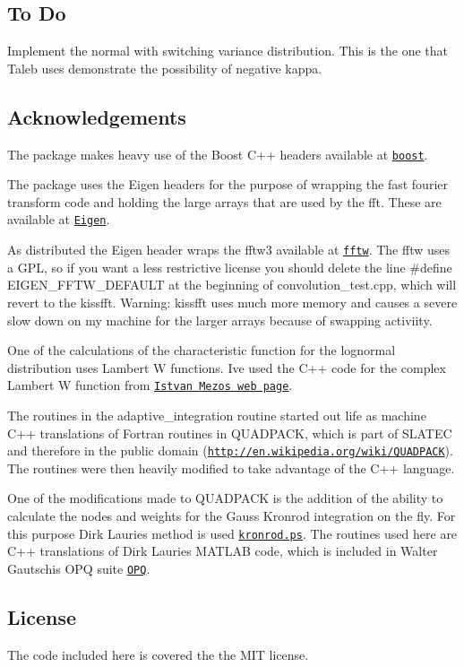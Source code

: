 \subsection*{To Do}


\begin{DoxyItemize}
\item Implement the normal with switching variance distribution. This is the one that Taleb uses demonstrate the possibility of negative kappa.
\end{DoxyItemize}

\subsection*{Acknowledgements}


\begin{DoxyEnumerate}
\item The package makes heavy use of the Boost C++ headers available at \href{http://www.boost.org}{\tt boost}.
\item The package uses the Eigen headers for the purpose of wrapping the fast fourier transform code and holding the large arrays that are used by the fft. These are available at \href{http://www.eigen.tuxfamily.org}{\tt Eigen}.
\item As distributed the Eigen header wraps the fftw3 available at \href{http://fftw.org}{\tt fftw}. The fftw uses a G\+PL, so if you want a less restrictive license you should delete the line \#define E\+I\+G\+E\+N\+\_\+\+F\+F\+T\+W\+\_\+\+D\+E\+F\+A\+U\+LT at the beginning of convolution\+\_\+test.\+cpp, which will revert to the kissfft. Warning\+: kissfft uses much more memory and causes a severe slow down on my machine for the larger arrays because of swapping activiity.
\item One of the calculations of the characteristic function for the lognormal distribution uses Lambert W functions. I\textquotesingle{}ve used the C++ code for the complex Lambert W function from \href{https://sites.google.com/site/istvanmezo81/others}{\tt Istvan Mezo\textquotesingle{}s web page}.
\item The routines in the adaptive\+\_\+integration routine started out life as machine C++ translations of Fortran routines in Q\+U\+A\+D\+P\+A\+CK, which is part of S\+L\+A\+T\+EC and therefore in the public domain (\href{http://en.wikipedia.org/wiki/QUADPACK}{\tt http\+://en.\+wikipedia.\+org/wiki/\+Q\+U\+A\+D\+P\+A\+CK}). The routines were then heavily modified to take advantage of the C++ language.
\item One of the modifications made to Q\+U\+A\+D\+P\+A\+CK is the addition of the ability to calculate the nodes and weights for the Gauss Kronrod integration on the fly. For this purpose Dirk Laurie\textquotesingle{}s method is used \href{http://dip.sun.ac.za/~laurie/papers/kronrod/kronrod.ps}{\tt kronrod.\+ps}. The routines used here are C++ translations of Dirk Laurie\textquotesingle{}s M\+A\+T\+L\+AB code, which is included in Walter Gautschi\textquotesingle{}s O\+PQ suite \href{https://www.cs.purdue.edu/archives/2002/wxg/codes/OPQ.html}{\tt O\+PQ}.
\end{DoxyEnumerate}

\subsection*{License}

The code included here is covered the the M\+IT license. 